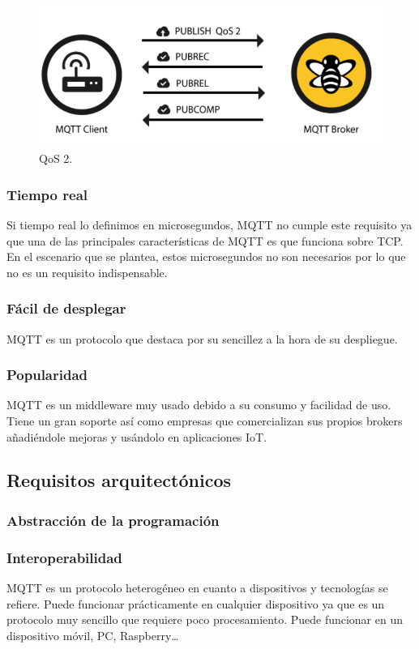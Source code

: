 \documentclass[12pt, twoside]{book}
\begin{document}
\begin{itemize}
\begin{figure}[h!]
\centering
\includegraphics[scale=0.3]{images/qos2}
\caption{QoS 2.\cite{hive}}\label{L408}
\end{figure}
\end{itemize}
\subsubsection*{Tiempo real}
Si tiempo real lo definimos en microsegundos, MQTT no cumple este requisito ya que una de las principales características de MQTT es que funciona sobre TCP. En el escenario que se plantea, estos microsegundos no son necesarios por lo que no es un requisito indispensable.

\subsubsection*{Fácil de desplegar}
MQTT es un protocolo que destaca por su sencillez a la hora de su despliegue.
\subsubsection*{Popularidad}
MQTT es un middleware muy usado debido a su consumo y facilidad de uso. Tiene un gran soporte así como empresas que comercializan sus propios brokers añadiéndole mejoras y usándolo en aplicaciones IoT.
\subsection{Requisitos arquitectónicos}
\subsubsection*{Abstracción de la programación}

\subsubsection*{Interoperabilidad}
MQTT es un protocolo heterogéneo en cuanto a dispositivos y tecnologías se refiere. Puede funcionar prácticamente en cualquier dispositivo ya que es un protocolo muy sencillo que requiere poco procesamiento. Puede funcionar en un dispositivo móvil, PC, Raspberry…
\end{document}
